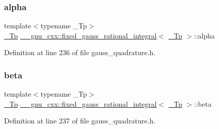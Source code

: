 \subsubsection{\texorpdfstring{alpha}{alpha}}
{\footnotesize\ttfamily template$<$typename \+\_\+\+Tp$>$ \\
\hyperlink{namespace____gnu__cxx_a3b19a9c800ca194374ef9172290f7d79}{\+\_\+\+Tp} \hyperlink{struct____gnu__cxx_1_1fixed__gauss__rational__integral}{\+\_\+\+\_\+gnu\+\_\+cxx\+::fixed\+\_\+gauss\+\_\+rational\+\_\+integral}$<$ \hyperlink{namespace____gnu__cxx_a3b19a9c800ca194374ef9172290f7d79}{\+\_\+\+Tp} $>$\+::alpha}



Definition at line 236 of file gauss\+\_\+quadrature.\+h.

\mbox{\label{struct____gnu__cxx_1_1fixed__gauss__rational__integral_aa6c563ee188859be79a987b67312d7ac}} 
\subsubsection{\texorpdfstring{beta}{beta}}
{\footnotesize\ttfamily template$<$typename \+\_\+\+Tp$>$ \\
\hyperlink{namespace____gnu__cxx_a3b19a9c800ca194374ef9172290f7d79}{\+\_\+\+Tp} \hyperlink{struct____gnu__cxx_1_1fixed__gauss__rational__integral}{\+\_\+\+\_\+gnu\+\_\+cxx\+::fixed\+\_\+gauss\+\_\+rational\+\_\+integral}$<$ \hyperlink{namespace____gnu__cxx_a3b19a9c800ca194374ef9172290f7d79}{\+\_\+\+Tp} $>$\+::beta}



Definition at line 237 of file gauss\+\_\+quadrature.\+h.

\mbox{\label{struct____gnu__cxx_1_1fixed__gauss__rational__integral_aa58df016c4139a1001cd3b155cc50256}} 
